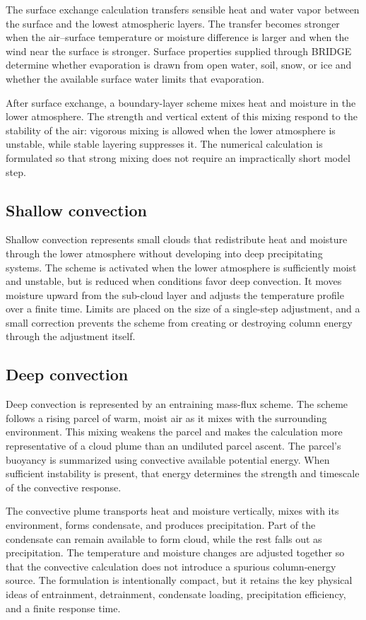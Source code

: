 The surface exchange calculation transfers sensible heat and water vapor between the surface and the lowest atmospheric layers.  The transfer becomes stronger when the air--surface temperature or moisture difference is larger and when the wind near the surface is stronger.  Surface properties supplied through BRIDGE determine whether evaporation is drawn from open water, soil, snow, or ice and whether the available surface water limits that evaporation.

After surface exchange, a boundary-layer scheme mixes heat and moisture in the lower atmosphere.  The strength and vertical extent of this mixing respond to the stability of the air: vigorous mixing is allowed when the lower atmosphere is unstable, while stable layering suppresses it.  The numerical calculation is formulated so that strong mixing does not require an impractically short model step.

\subsection{Shallow convection}

Shallow convection represents small clouds that redistribute heat and moisture through the lower atmosphere without developing into deep precipitating systems.  The scheme is activated when the lower atmosphere is sufficiently moist and unstable, but is reduced when conditions favor deep convection.  It moves moisture upward from the sub-cloud layer and adjusts the temperature profile over a finite time.  Limits are placed on the size of a single-step adjustment, and a small correction prevents the scheme from creating or destroying column energy through the adjustment itself.

\subsection{Deep convection}

Deep convection is represented by an entraining mass-flux scheme.  The scheme follows a rising parcel of warm, moist air as it mixes with the surrounding environment.  This mixing weakens the parcel and makes the calculation more representative of a cloud plume than an undiluted parcel ascent.  The parcel's buoyancy is summarized using convective available potential energy.  When sufficient instability is present, that energy determines the strength and timescale of the convective response.

The convective plume transports heat and moisture vertically, mixes with its environment, forms condensate, and produces precipitation.  Part of the condensate can remain available to form cloud, while the rest falls out as precipitation.  The temperature and moisture changes are adjusted together so that the convective calculation does not introduce a spurious column-energy source.  The formulation is intentionally compact, but it retains the key physical ideas of entrainment, detrainment, condensate loading, precipitation efficiency, and a finite response time.

